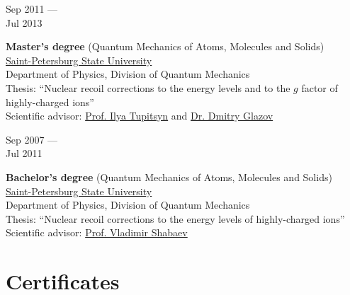 \documentclass[10pt,a4paper]{article}
\newcommand{\lmpratio}{0.15}
\newcommand{\rmpratio}{0.74}
\newcommand{\horizontalSpace}{0.05\textwidth}
\newcommand{\sectionMain}[1]{\textbf{#1}}
\begin{document}
	\begin{minipage}[t]{\lmpratio\textwidth}
		Sep 2011 --- \\Jul 2013
	\end{minipage}
	\hspace{\horizontalSpace}
	\begin{minipage}[t]{\rmpratio\textwidth}
		\sectionMain{Master's degree} (Quantum Mechanics of Atoms, Molecules and Solids) \\[0.1cm]
		\href{http://english.spbu.ru/}{Saint-Petersburg State University}\\ Department of Physics, Division of Quantum Mechanics\\[0.3cm]
		 Thesis: ``Nuclear recoil corrections to the energy levels and to the $g$ factor of highly-charged ions''\\[0.3cm]
		 Scientific advisor: \href{http://fock.phys.spbu.ru/english/tupicin_en.htm}{Prof. Ilya Tupitsyn} and \href{http://fock.phys.spbu.ru/glazov.htm}{Dr. Dmitry Glazov}
	\end{minipage}

	\vspace{1cm}
	
	\begin{minipage}[t]{\lmpratio\textwidth}
		Sep 2007 --- \\Jul 2011
	\end{minipage}
	\hspace{\horizontalSpace}
	\begin{minipage}[t]{\rmpratio\textwidth}
		\sectionMain{Bachelor's degree} (Quantum Mechanics of Atoms, Molecules and Solids) \\[0.1cm]
		\href{http://english.spbu.ru/}{Saint-Petersburg State University}\\ Department of Physics, Division of Quantum Mechanics\\[0.3cm]
		 Thesis: ``Nuclear recoil corrections to the energy levels of highly-charged ions''\\[0.3cm]
		 Scientific advisor: \href{http://fock.phys.spbu.ru/english/shabaev_en.htm}{Prof. Vladimir Shabaev}
	\end{minipage}
	
	\newpage
	
	\section*{Certificates}	
\end{document}
